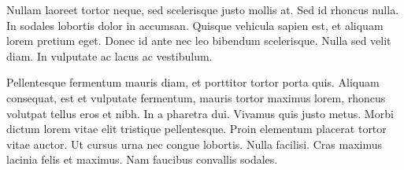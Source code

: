 Nullam laoreet tortor neque, sed scelerisque justo mollis at. Sed id rhoncus nulla. In sodales lobortis dolor in accumsan. Quisque vehicula sapien est, et aliquam lorem pretium eget. Donec id ante nec leo bibendum scelerisque. Nulla sed velit diam. In vulputate ac lacus ac vestibulum.

Pellentesque fermentum mauris diam, et porttitor tortor porta quis. Aliquam consequat, est et vulputate fermentum, mauris tortor maximus lorem, rhoncus volutpat tellus eros et nibh. In a pharetra dui. Vivamus quis justo metus. Morbi dictum lorem vitae elit tristique pellentesque. Proin elementum placerat tortor vitae auctor. Ut cursus urna nec congue lobortis. Nulla facilisi. Cras maximus lacinia felis et maximus. Nam faucibus convallis sodales. 

